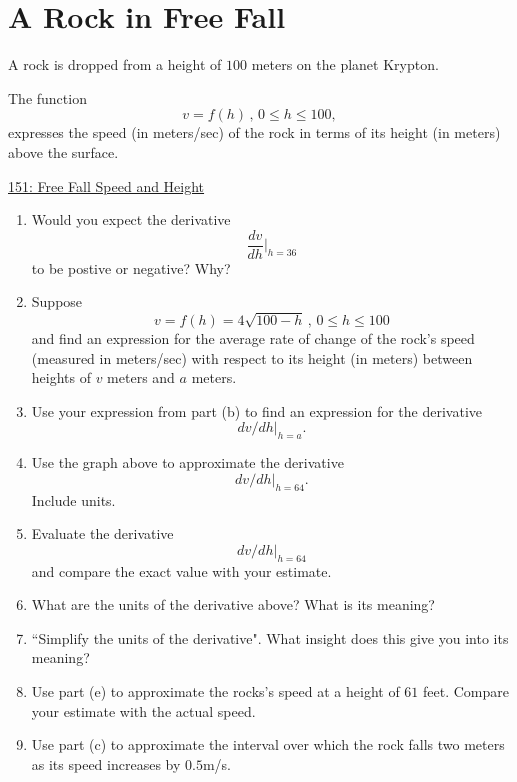 \documentclass{ximera}
\begin{document}
\section{A Rock in Free Fall}

\begin{question}  \label{Qdfgg4t66}
A rock is dropped from a height of $100$ meters on the planet Krypton.

The function
\[
     v = f(h) \, , \, 0\leq h \leq 100 ,
\]
expresses the speed (in meters/sec) of the rock in terms of its height (in meters) above the surface.

\begin{onlineOnly}
    \begin{center}
\end{center}
\end{onlineOnly}

\href{https://www.desmos.com/calculator/hcqb5nxc18}{151: Free Fall Speed and Height}

\begin{enumerate}
\item Would you expect the derivative 
\[
  \frac{dv}{dh}\Big|_{h=36}
\]
to be postive or negative? Why?

\item Suppose
\[
     v = f(h)  = 4\sqrt{100-h} \, , \, 0\leq h \leq 100
\]
and find an expression for the average rate of change of the rock's speed (measured in meters/sec) with respect to its height (in meters) between heights of $v$ meters and $a$ meters.

\item Use your expression from part (b) to find an expression for the derivative 
\[
   dv/dh \Big|_{h=a}. 
\]

\item Use the graph above to approximate the derivative
\[
       dv/dh \Big|_{h=64} .
\]
Include units.

\item Evaluate the derivative
\[
       dv/dh \Big|_{h=64} 
\]
and compare the exact value with your estimate.

\item What are the units of the derivative above? What is its meaning?

\item ``Simplify the units of the derivative". What insight does this give you into its meaning?

\item Use part (e) to approximate the rocks's speed at a height of $61$ feet. Compare your estimate with the actual speed.

\item Use part (c) to approximate the interval over which the rock falls two meters as its speed increases by $0.5$m/s.


\end{enumerate}
\end{question}
\end{document}

